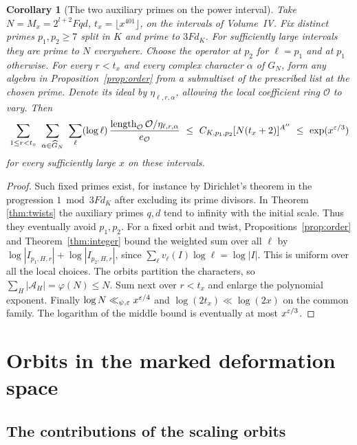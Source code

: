 \documentclass[a4paper,11pt]{article}
\newtheorem{corollary}[proposition]{Corollary}
\theoremstyle{definition}
\theoremstyle{remark}
\newcommand{\len}{\operatorname{length}}\newcommand{\Res}{\operatorname*{Res}}
\numberwithin{equation}{section}
\newcommand{\OO}{\mathcal O}
\begin{document}
\begin{corollary}[The two auxiliary primes on the power interval]\label{cor:interval}
Take \(N=M_x=2^{l+2}Fqd\), \(t_x=\lfloor x^{401}\rfloor\), on the intervals of Volume~IV. Fix distinct primes \(p_1,p_2\ge7\) split in \(K\) and prime to \(3Fd_K\). For sufficiently large intervals they are prime to \(N\) everywhere. Choose the operator at \(p_2\) for \(\ell=p_1\) and at \(p_1\) otherwise. For every \(r<t_x\) and every complex character \(\alpha\) of \(G_N\), form any algebra in Proposition~\ref{prop:order} from a submultiset of the prescribed list at the chosen prime. Denote its ideal by \(\eta_{\ell,r,\alpha}\), allowing the local coefficient ring \(\OO\) to vary. Then
\begin{equation}
 \sum_{1\le r<t_x}\ \sum_{\alpha\in\widehat G_N}\ \sum_\ell
   (\log\ell)\,\frac{\len_\OO\OO/\eta_{\ell,r,\alpha}}{e_\OO}
 \ \le\ C_{K,p_1,p_2}[N(t_x+2)]^{A''}
 \ \le\ \exp(x^{\eps/3})
 \label{eq:budget}
\end{equation}
for every sufficiently large \(x\) on these intervals.
\end{corollary}
\begin{proof}
Such fixed primes exist, for instance by Dirichlet's theorem in the progression \(1\bmod 3Fd_K\) after excluding its prime divisors. In Theorem \ref{thm:twists} the auxiliary primes \(q,d\) tend to infinity with the initial scale. Thus they eventually avoid \(p_1,p_2\). For a fixed orbit and twist, Propositions~\ref{prop:order} and Theorem~\ref{thm:integer} bound the weighted sum over all \(\ell\) by \(\log|I_{p_1,H,r}|+\log|I_{p_2,H,r}|\), since \(\sum_\ell v_\ell(I)\log\ell=\log|I|\). This is uniform over all the local choices. The orbits partition the characters, so \(\sum_H|\mathcal A_H|=\varphi(N)\le N\). Sum next over \(r<t_x\) and enlarge the polynomial exponent. Finally \(\log N\ll_{\psi,\varepsilon} x^{\varepsilon/4}\) and \(\log(2t_x)\ll\log(2x)\) on the common family. The logarithm of the middle bound is eventually at most \(x^{\varepsilon/3}\).
\end{proof}

\section{Orbits in the marked deformation space}\label{nav:g-IV-1}

\subsection{The contributions of the scaling orbits}\label{nav:IV-03}
\label{sec:orbit34}
\end{document}
